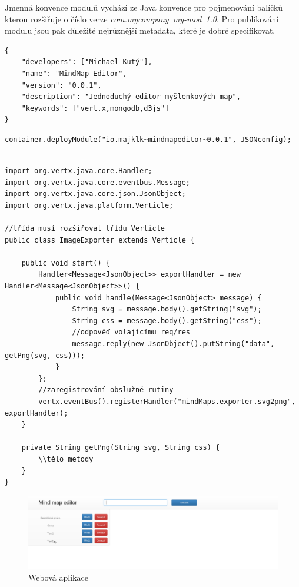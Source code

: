 Jmenná konvence modulů vychází ze Java konvence\cite{javaPKG} pro pojmenování balíčků kterou rozšiřuje o číslo verze \emph{com.mycompany~my-mod~1.0}.
Pro publikování modulu jsou pak důležité nejrůznější metadata, které je dobré specifikovat.
\begin{lstlisting}
{
	"developers": ["Michael Kutý"],
	"name": "MindMap Editor",
	"version": "0.0.1",
	"description": "Jednoduchý editor myšlenkových map",
	"keywords": ["vert.x,mongodb,d3js"]
}  
\end{lstlisting}

\begin{lstlisting}[caption=Spuštění modulu v jazyce Java]
container.deployModule("io.majklk~mindmapeditor~0.0.1", JSONconfig);
\end{lstlisting}

\begin{lstlisting}[caption=Verticle v jazyce Java]

import org.vertx.java.core.Handler;
import org.vertx.java.core.eventbus.Message;
import org.vertx.java.core.json.JsonObject;
import org.vertx.java.platform.Verticle;

//třída musí rozšiřovat třídu Verticle
public class ImageExporter extends Verticle {
	
	public void start() {
		Handler<Message<JsonObject>> exportHandler = new Handler<Message<JsonObject>>() {
			public void handle(Message<JsonObject> message) {
				String svg = message.body().getString("svg");
				String css = message.body().getString("css");
				//odpověď volajícímu req/res
				message.reply(new JsonObject().putString("data", getPng(svg, css)));
			}
		};
		//zaregistrování obslužné rutiny
		vertx.eventBus().registerHandler("mindMaps.exporter.svg2png", exportHandler);
	}

	private String getPng(String svg, String css) { 
		\\tělo metody
	}
}
\end{lstlisting}

\begin{figure}
\begin{centering}
\includegraphics[width	=1\textwidth]{obrazky/mindmap1}
\par\end{centering}
\caption{Webová aplikace\label{fig:midnmap1}}
\end{figure}


